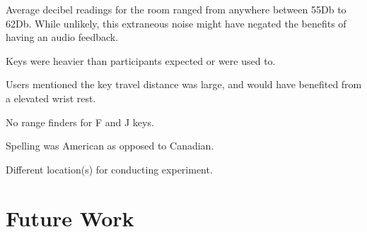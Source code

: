 \documentclass{sigchi}
\begin{document}
Average decibel readings for the room ranged from anywhere between 55Db to 62Db. While unlikely, this extraneous noise might have negated the benefits of having an audio feedback.

Keys were heavier than participants expected or were used to.

Users mentioned the key travel distance was large, and would have benefited from a elevated wrist rest. 

No range finders for F and J keys. 

Spelling was American as opposed to Canadian. 

Different location(s) for conducting experiment.




\section{Future Work}

\balance{}



\end{document}
